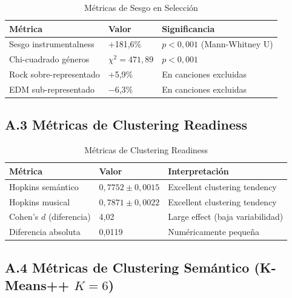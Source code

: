 \begin{table}[htbp]
\centering
\caption{Métricas de Sesgo en Selección}
\label{tab:metricas-sesgo}
\begin{tabular}{lll}
\toprule
\textbf{Métrica} & \textbf{Valor} & \textbf{Significancia} \\
\midrule
Sesgo instrumentalness & +181,6\% & $p < 0{,}001$ (Mann-Whitney U) \\
Chi-cuadrado géneros & $\chi^2 = 471{,}89$ & $p < 0{,}001$ \\
Rock sobre-representado & +5,9\% & En canciones excluidas \\
EDM sub-representado & $-$6,3\% & En canciones excluidas \\
\bottomrule
\end{tabular}
\end{table}

\subsection*{A.3 Métricas de Clustering Readiness}

\begin{table}[htbp]
\centering
\caption{Métricas de Clustering Readiness}
\label{tab:metricas-readiness}
\begin{tabular}{lll}
\toprule
\textbf{Métrica} & \textbf{Valor} & \textbf{Interpretación} \\
\midrule
Hopkins semántico & $0{,}7752 \pm 0{,}0015$ & Excellent clustering tendency \\
Hopkins musical & $0{,}7871 \pm 0{,}0022$ & Excellent clustering tendency \\
Cohen's $d$ (diferencia) & 4,02 & Large effect (baja variabilidad) \\
Diferencia absoluta & 0,0119 & Numéricamente pequeña \\
\bottomrule
\end{tabular}
\end{table}

\subsection*{A.4 Métricas de Clustering Semántico (K-Means++ $K=6$)}

